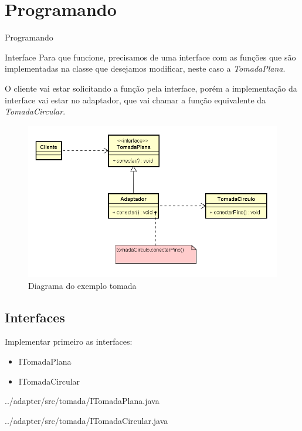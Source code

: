 \documentclass{if-beamer}
\begin{document}
\section{Programando}
\begin{frame}{Programando}
	
	\begin{alertblock}{Interface}
		Para que funcione, precisamos de uma interface com as funções que são implementadas na classe que desejamos modificar, neste caso a {\itshape TomadaPlana}.

		O cliente vai estar solicitando a função pela interface, porém a implementação da interface vai estar no adaptador, que vai chamar a função equivalente da {\itshape TomadaCircular}.
	\end{alertblock}

	\begin{figure}
		\centering
		\includegraphics[scale=0.5]{diagrama.png}
		\caption{Diagrama do exemplo tomada}
	\end{figure}
\end{frame}

\begin{frame}
	
	\subsection{Interfaces}
	\begin{exampleblock}

		Implementar primeiro as interfaces:
		\begin{itemize}
			\item ITomadaPlana
			\item ITomadaCircular
		\end{itemize}
	\end{exampleblock}

	 {../adapter/src/tomada/ITomadaPlana.java}
	
	 {../adapter/src/tomada/ITomadaCircular.java}
\end{frame}
\end{document}
